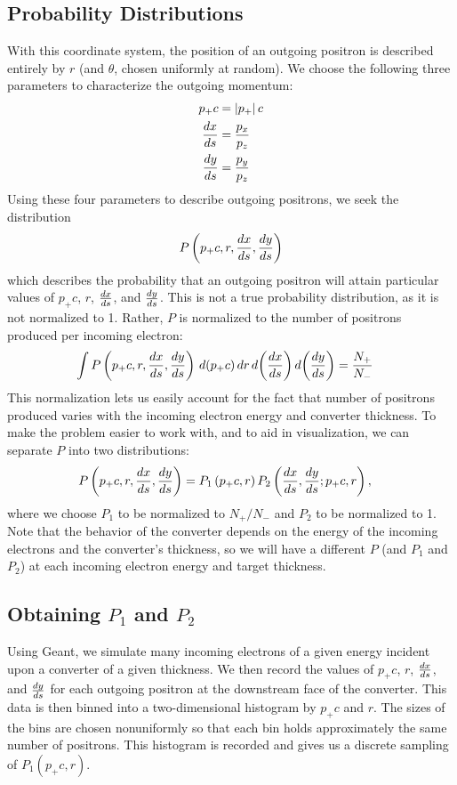 \documentclass[12pt]{article}
\begin{document}
\subsection{Probability Distributions}
With this coordinate system, the position of an outgoing positron is described entirely by $r$ (and $\theta$, chosen uniformly at random).
We choose the following three parameters to characterize the outgoing momentum:
\begin{align}
p_+ c & = \left| p_+ \right| c \\
\frac{dx}{ds} & = \frac{p_x}{p_z} \\
\frac{dy}{ds} & = \frac{p_y}{p_z}
\end{align}
Using these four parameters to describe outgoing positrons, we seek the distribution
\begin{align}
P \left( p_+ c, r, \frac{dx}{ds}, \frac{dy}{ds} \right)
\end{align}
which describes the probability that an outgoing positron will attain particular values of $p_+ c$, $r$, $\frac{dx}{ds}$, and $\frac{dy}{ds}$.
This is not a true probability distribution, as it is not normalized to 1.
Rather, $P$ is normalized to the number of positrons produced per incoming electron:
\begin{align}
\int P \left( p_+ c, r, \frac{dx}{ds}, \frac{dy}{ds} \right) \, d(p_+ c) \, dr \, d \! \left( \frac{dx}{ds} \right) d \! \left( \frac{dy}{ds} \right) & = \frac{N_+}{N_-}
\end{align}
This normalization lets us easily account for the fact that number of positrons produced varies with the incoming electron energy and converter thickness.
To make the problem easier to work with, and to aid in visualization, we can separate $P$ into two distributions:
\begin{align}
P \left( p_+ c, r, \frac{dx}{ds}, \frac{dy}{ds} \right) & = P_1 \left( p_+ c, r \right) P_2 \left( \frac{dx}{ds}, \frac{dy}{ds} ; p_+ c , r \right),
\end{align}
where we choose $P_1$ to be normalized to $N_+/N_-$ and $P_2$ to be normalized to 1.
Note that the behavior of the converter depends on the energy of the incoming electrons and the converter's thickness, so we will have a different $P$ (and $P_1$ and $P_2$) at each incoming electron energy and target thickness.

\subsection{Obtaining $P_1$ and $P_2$}

Using Geant\cite{geant}, we simulate many incoming electrons of a given energy incident upon a converter of a given thickness.
We then record the values of $p_+ c$, $r$, $\frac{dx}{ds}$, and $\frac{dy}{ds}$ for each outgoing positron at the downstream face of the converter.
This data is then binned into a two-dimensional histogram by $p_+ c$ and $r$.
The sizes of the bins are chosen nonuniformly so that each bin holds approximately the same number of positrons.
This histogram is recorded and gives us a discrete sampling of $P_1(p_+c, r)$.
\end{document}
